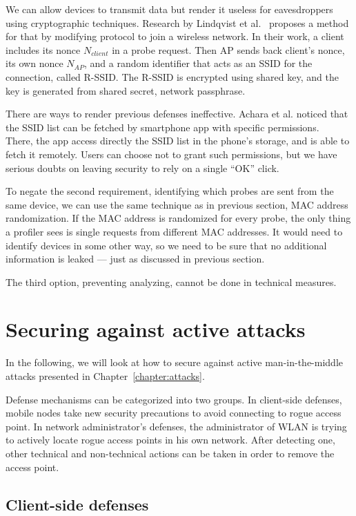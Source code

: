 \documentclass[12pt,a4paper,oneside,pdftex]{report}
\begin{document}
We can allow devices to transmit data but render it useless for eavesdroppers using cryptographic techniques. Research by Lindqvist et al.~\cite{lindqvist2009privacy} proposes a method for that by modifying protocol to join a wireless network. In their work, a client includes its nonce $N_{client}$ in a probe request. Then AP sends back client's nonce, its own nonce $N_{AP}$, and a random identifier that acts as an SSID for the connection, called R-SSID. The R-SSID is encrypted using shared key, and the key is generated from shared secret, network passphrase.

There are ways to render previous defenses ineffective. Achara et al. noticed that the SSID list can be fetched by smartphone app with specific permissions.~\cite{2014_WISEC_Achara} There, the app access directly the SSID list in the phone's storage, and is able to fetch it remotely. Users can choose not to grant such permissions, but we have serious doubts on leaving security to rely on a single ``OK'' click.

To negate the second requirement, identifying which probes are sent from the same device, we can use the same technique as in previous section, MAC address randomization. If the MAC address is randomized for every probe, the only thing a profiler sees is single requests from different MAC addresses. It would need to identify devices in some other way, so we need to be sure that no additional information is leaked --- just as discussed in previous section.

The third option, preventing analyzing, cannot be done in technical measures. 


\section{Securing against active attacks}

In the following, we will look at how to secure against active man-in-the-middle attacks presented in Chapter~\ref{chapter:attacks}. 

Defense mechanisms can be categorized into two groups. In client-side defenses, mobile nodes take new security precautions to avoid connecting to rogue access point. In network administrator's defenses, the administrator of WLAN is trying to actively locate rogue access points in his own network. After detecting one, other technical and non-technical actions can be taken in order to remove the access point.

\subsection{Client-side defenses}
\end{document}
